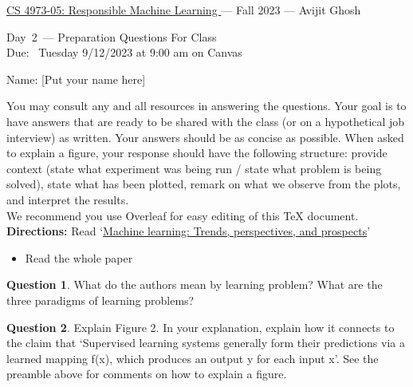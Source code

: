 \documentclass[11pt]{article}
\newcommand{\yournames}{[Put your name here]}
\newcommand{\daynum}{2}
\newcommand{\hwdue}{Tuesday 9/12/2023 at 9:00 am on Canvas}
\theoremstyle{definition}
\newcommand{\instructor}{Avijit Ghosh}
\theoremstyle{theorem}
\newtheorem{ques}{Question}
\newcommand{\response}{\medskip\noindent{\color{DarkBlue}\textbf{Response:}}}
\begin{document}
{\Large 
\begin{center}\href{https://evijit.io/teaching/}{CS 4973-05: Responsible Machine Learning
} --- Fall 2023 --- \instructor \end{center}}
{\large
\vspace{10pt}
\noindent Day~\daynum\  --- Preparation Questions For Class \vspace{2pt}\\
Due: ~\hwdue}

\bigskip
{\large
\noindent Name: \yournames \vspace{2pt}}

\vspace{15pt}

\noindent You may consult any and all resources in answering the questions.  Your goal is to have answers that are ready to be shared with the class (or on a hypothetical job interview) as written.  Your answers should be as concise as possible.  When asked to explain a figure, your response should have the following structure: provide context (state what experiment was being run / state what problem is being solved), state what has been plotted, remark on what we observe from the plots, and interpret the results. \\

\noindent We recommend you use Overleaf for easy editing of this TeX document.\\

\noindent \textbf{Directions:} 
\noindent Read `\href{https://www.cs.cmu.edu/~tom/pubs/Science-ML-2015.pdf}{Machine learning: Trends,
perspectives, and prospects}'
\begin{itemize}
\item Read the whole paper
\end{itemize}

\begin{ques} 
What do the authors mean by learning problem? What are the three paradigms of learning problems? \end{ques}

\response

\begin{ques} 
Explain Figure 2.  In your explanation, explain how it connects to the claim that `Supervised learning systems generally form their predictions via a learned mapping f(x), which produces an output y for each input x'.  See the preamble above for comments on how to explain a figure.\end{ques}
\end{document}

